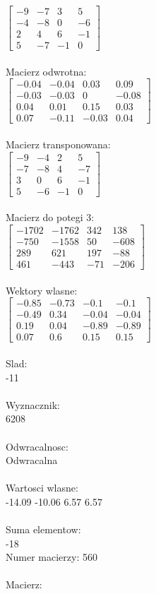 \documentclass[a4paper,12pt]{article}
\begin{document}
$\begin{bmatrix} -9&-7&3&5\\-4&-8&0&-6\\2&4&6&-1\\5&-7&-1&0 \end{bmatrix}$
\\
\\
Macierz odwrotna:\\

$\begin{bmatrix} -0.04&-0.04&0.03&0.09\\-0.03&-0.03&0&-0.08\\0.04&0.01&0.15&0.03\\0.07&-0.11&-0.03&0.04 \end{bmatrix}$
\\
\\
Macierz transponowana:\\

$\begin{bmatrix} -9&-4&2&5\\-7&-8&4&-7\\3&0&6&-1\\5&-6&-1&0 \end{bmatrix}$
\\
\\
Macierz do potegi 3:\\

$\begin{bmatrix} -1702&-1762&342&138\\-750&-1558&50&-608\\289&621&197&-88\\461&-443&-71&-206 \end{bmatrix}$
\\
\\
Wektory wlasne:\\

$\begin{bmatrix} -0.85&-0.73&-0.1&-0.1\\-0.49&0.34&-0.04&-0.04\\0.19&0.04&-0.89&-0.89\\0.07&0.6&0.15&0.15 \end{bmatrix}$
\\
\\
Slad:\\
-11
\\
\\
Wyznacznik:\\
6208
\\
\\
Odwracalnosc:\\
Odwracalna
\\
\\
Wartosci wlasne:\\
-14.09 -10.06 6.57 6.57
\\
\\
Suma elementow:\\
-18
\\
\newpage
Numer macierzy:
560
\\
\\
Macierz:\\
\end{document}
